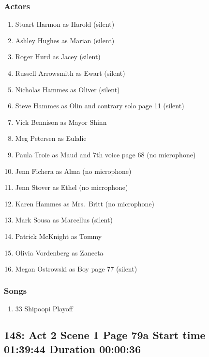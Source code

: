 \subsubsection{Actors}
\begin{enumerate}
\item Stuart Harmon as Harold (silent)
\item Ashley Hughes as Marian (silent)
\item Roger Hurd as Jacey (silent)
\item Russell Arrowsmith as Ewart (silent)
\item Nicholas Hammes as Oliver (silent)
\item Steve Hammes as Olin and contrary solo page 11 (silent)
\item Vick Bennison as Mayor Shinn
\item Meg Petersen as Eulalie
\item Paula Troie as Maud and 7th voice page 68 (no microphone)
\item Jenn Fichera as Alma (no microphone)
\item Jenn Stover as Ethel (no microphone)
\item Karen Hammes as Mrs.~Britt (no microphone)
\item Mark Sousa as Marcellus (silent)
\item Patrick McKnight as Tommy
\item Olivia Vordenberg as Zaneeta
\item Megan Ostrowski as Boy page 77 (silent)
\end{enumerate}

\subsubsection{Songs}
\begin{enumerate}
\item 33 Shipoopi Playoff
\end{enumerate}
\subsection{148: Act 2 Scene 1 Page 79a Start time 01:39:44 Duration 00:00:36}

